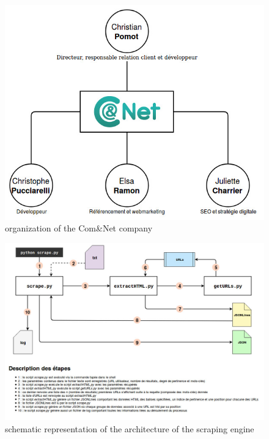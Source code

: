 \documentclass[12pt]{article}
\begin{document}
\begin{appendices}

\

\

\

\

\

\

\begin{figure}[h]
	\centering\includegraphics[scale=0.65]{Com&Net.jpg}
	\caption{organization of the Com\&Net company}
\end{figure}

\begin{figure}[p]
	\centering\includegraphics[scale=0.45]{architectureScraping.jpg}
	\caption{schematic representation of the architecture of the scraping engine}
\end{figure}


\end{appendices}
\end{document}
